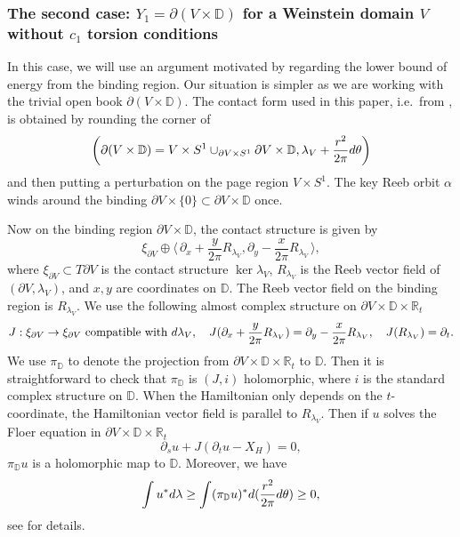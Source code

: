 \documentclass[reqno,11pt]{amsart}
\numberwithin{equation}{section}
\def\R{\mathbb{R}}
\def\D{{\mathbb D}}
\def\rd{{\rm d}}
\def\la{\langle\,}
\def\ra{\,\rangle}
\begin{document}
\subsubsection{The second case: $Y_1=\partial(V\times \D)$ for a Weinstein domain $V$ without $c_1$ torsion conditions}In this case, we will use an argument motivated by \cite[Lemma 5.5]{zbMATH06562001} regarding the lower bound of energy from the binding region. Our situation is simpler as we are working with the trivial open book $\partial(V\times \D)$. The contact form used in this paper, i.e.\ from \cite[\S 2,1]{zbMATH07673358}, is obtained by rounding the corner of 
$$\left(\partial(V\times \D) = V\times S^1\cup_{\partial V \times S^1} \partial V \times \D, \lambda_V+\frac{r^2}{2\pi} \rd \theta\right)$$
and then putting a perturbation on the page region $V\times S^1$. The key Reeb orbit $\alpha$ winds around the binding $\partial V \times \{0\} \subset \partial V\times \D$ once. 

Now on the binding region $\partial V \times \D$, the contact structure is given by
$$\xi_{\partial V }\oplus \la \partial_x+\frac{y}{2\pi}R_{\lambda_V},\partial_y-\frac{x}{2\pi}R_{\lambda_V} \ra,$$
where $\xi_{\partial V}\subset T\partial V$ is the contact structure $\ker \lambda_V$, $R_{\lambda_V}$ is the Reeb vector field of $(\partial V, \lambda_V)$, and $x,y$ are coordinates on $\D$. The Reeb vector field on the binding region is $R_{\lambda_V}$. We use the following almost complex structure on $\partial V \times \D \times \R_t$
$$J:\xi_{\partial V} \to \xi_{\partial V} \text{ compatible with } \rd \lambda_V, \quad J(\partial_x+\frac{y}{2\pi}R_{\lambda_V})=\partial_y-\frac{x}{2\pi}R_{\lambda_V}, \quad  J(R_{\lambda_V})=\partial_t.$$
We use $\pi_{\D}$ to denote the projection from $\partial V \times \D \times \R_t$ to $\D$. Then it is straightforward to check that $\pi_{\D}$ is $(J,i)$ holomorphic, where $i$ is the standard complex structure on $\D$. When the Hamiltonian only depends on the $t$-coordinate, the Hamiltonian vector field is parallel to $R_{\lambda_V}$. Then if $u$ solves the Floer equation in $\partial V \times \D \times \R_t$
$$\partial_su+J(\partial_tu-X_H)=0,$$
$\pi_{\D} u$ is a holomorphic map to $\D$. Moreover, we have 
\begin{equation}\label{eqn:area}
    \int u^*\rd\lambda \ge \int (\pi_{\D}u)^*\rd (\frac{r^2}{2\pi}\rd \theta)\ge 0,
\end{equation}
see \cite[the proof of Lemma 4.6]{bowden2022making} for details. 
\end{document}

